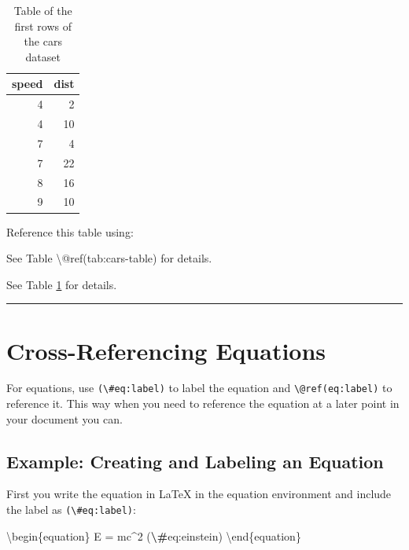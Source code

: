 \documentclass[
]{book}
\newenvironment{Shaded}{\begin{snugshade}}{\end{snugshade}}
\newcommand{\NormalTok}[1]{#1}
\newcommand{\SpecialCharTok}[1]{\textcolor[rgb]{0.81,0.36,0.00}{\textbf{#1}}}
\theoremstyle{definition}
\theoremstyle{definition}
\theoremstyle{definition}
\theoremstyle{definition}
\theoremstyle{remark}
\begin{document}
\begin{table}

\caption{\label{tab:cars-table}Table of the first rows of the cars dataset}
\centering
\begin{tabular}[t]{r|r}
\hline
speed & dist\\
\hline
4 & 2\\
\hline
4 & 10\\
\hline
7 & 4\\
\hline
7 & 22\\
\hline
8 & 16\\
\hline
9 & 10\\
\hline
\end{tabular}
\end{table}

Reference this table using:

\begin{Shaded}
\begin{Highlighting}[]
\NormalTok{See Table \textbackslash{}@ref(tab:cars{-}table) for details.}
\end{Highlighting}
\end{Shaded}

See Table \ref{tab:cars-table} for details.

\begin{center}\rule{0.5\linewidth}{0.5pt}\end{center}

\section{Cross-Referencing Equations}\label{cross-referencing-equations}

For equations, use \texttt{(\textbackslash{}\#eq:label)} to label the equation and \texttt{\textbackslash{}@ref(eq:label)} to reference it. This way when you need to reference the equation at a later point in your document you can.

\subsection{Example: Creating and Labeling an Equation}\label{example-creating-and-labeling-an-equation}

First you write the equation in LaTeX in the equation environment and include the label as \texttt{(\textbackslash{}\#eq:label)}:

\begin{Shaded}
\begin{Highlighting}[]
\NormalTok{\textbackslash{}begin\{equation\}}
\NormalTok{  E = mc\^{}2}
\NormalTok{  (}\SpecialCharTok{\textbackslash{}\#}\NormalTok{eq:einstein)}
\NormalTok{\textbackslash{}end\{equation\}}
\end{Highlighting}
\end{Shaded}
\end{document}
